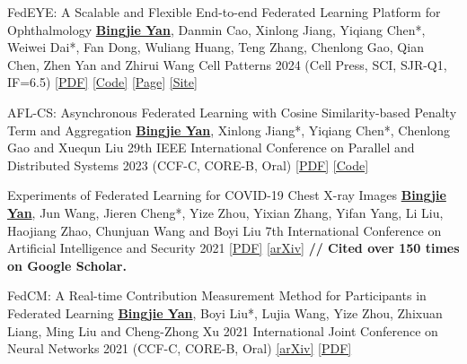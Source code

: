 \begin{cvpublications}

\cvpublication
{FedEYE: A Scalable and Flexible End-to-end Federated Learning Platform for Ophthalmology} %
{\underline{\textbf{Bingjie Yan}}, Danmin Cao, Xinlong Jiang, Yiqiang Chen*, Weiwei Dai*, Fan Dong, Wuliang Huang, Teng Zhang, Chenlong Gao, Qian Chen, Zhen Yan and Zhirui Wang} %
{Cell Patterns} %
{2024} %
{(Cell Press, SCI, SJR-Q1, IF=6.5)} %
{\href{https://www.cell.com/patterns/fulltext/S2666-3899(24)00019-9}{[PDF]} \href{https://github.com/beiyuouo/FedEYE}{[Code]} \href{https://www.bj-yan.top/FedEYE/}{[Page]} \href{https://fedeye.aierchina.com/}{[Site]}} %


\cvpublication
{AFL-CS: Asynchronous Federated Learning with Cosine Similarity-based Penalty Term and Aggregation} %
{\underline{\textbf{Bingjie Yan}}, Xinlong Jiang*, Yiqiang Chen*, Chenlong Gao and Xuequn Liu} %
{29th IEEE International Conference on Parallel and Distributed Systems} %
{2023} %
{(CCF-C, CORE-B, \textcolor{awesome}{Oral})} %
{\href{https://ieeexplore.ieee.org/document/10476054}{[PDF]} \href{https://github.com/beiyuouo/AFL-CS-ICPADS}{[Code]}} %


\cvpublication
{Experiments of Federated Learning for COVID-19 Chest X-ray Images} %
{\underline{\textbf{Bingjie Yan}}, Jun Wang, Jieren Cheng*, Yize Zhou, Yixian Zhang, Yifan Yang, Li Liu, Haojiang Zhao, Chunjuan Wang and Boyi Liu} %
{7th International Conference on Artificial Intelligence and Security} %
{2021} %
{} %
{
	\href{https://link.springer.com/chapter/10.1007/978-3-030-78618-2_4}{[PDF]} \href{https://arxiv.org/abs/2007.05592}{[arXiv]}
	\newline \textbf{// Cited over 150 times on Google Scholar.} 
} %


\cvpublication
{FedCM: A Real-time Contribution Measurement Method for Participants in Federated Learning} %
{\underline{\textbf{Bingjie Yan}}, Boyi Liu*, Lujia Wang, Yize Zhou, Zhixuan Liang, Ming Liu and Cheng-Zhong Xu} %
{2021 International Joint Conference on Neural Networks} %
{2021} %
{(CCF-C, CORE-B, \textcolor{awesome}{Oral})} %
{\href{https://arxiv.org/abs/2009.03510}{[arXiv]} \href{https://ieeexplore.ieee.org/abstract/document/9534451/}{[PDF]}} %


\end{cvpublications}
